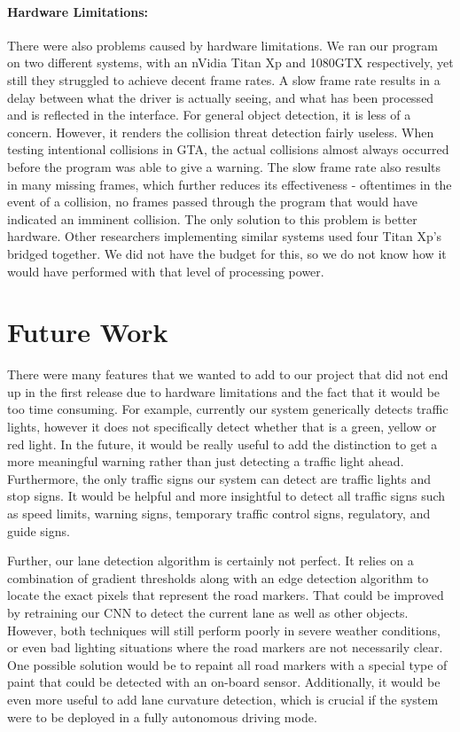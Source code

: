 \paragraph{Hardware Limitations:} There were also problems caused by hardware limitations.  We ran our program on two different systems, with an nVidia Titan Xp and 1080GTX respectively, yet still they struggled to achieve decent frame rates.  A slow frame rate results in a delay between what the driver is actually seeing, and what has been processed and is reflected in the interface.  For general object detection, it is less of a concern.  However, it renders the collision threat detection fairly useless.  When testing intentional collisions in GTA, the actual collisions almost always occurred before the program was able to give a warning.  The slow frame rate also results in many missing frames, which further reduces its effectiveness - oftentimes in the event of a collision, no frames passed through the program that would have indicated an imminent collision.  The only solution to this problem is better hardware.  Other researchers implementing similar systems used four Titan Xp's bridged together. We did not have the budget for this, so we do not know how it would have performed with that level of processing power.   



\section{Future Work}

There were many features that we wanted to add to our project that did not end up in the first release due to hardware limitations and the fact that it would be too time consuming. For example, currently our system generically detects traffic lights, however it does not specifically detect whether that is a green, yellow or red light. In the future, it would be really useful to add the distinction to get a more meaningful warning rather than just detecting a traffic light ahead. Furthermore, the only traffic signs our system can detect are traffic lights and stop signs. It would be helpful and more insightful to detect all traffic signs such as speed limits, warning signs, temporary traffic control signs, regulatory, and guide signs. \par 

Further, our lane detection algorithm is certainly not perfect. It relies on a combination of gradient thresholds along with an edge detection algorithm to locate the exact pixels that represent the road markers. That could be improved by retraining our CNN to detect the current lane as well as other objects. However, both techniques will still perform poorly in severe weather conditions, or even bad lighting situations where the road markers are not necessarily clear. One possible solution would be to repaint all road markers with a special type of paint that could be detected with an on-board sensor. Additionally, it would be even more useful to add lane curvature detection, which is crucial if the system were to be deployed in a fully autonomous driving mode. \par

